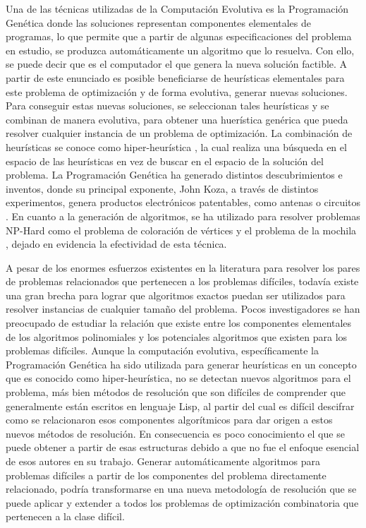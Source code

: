 Una de las técnicas utilizadas de la Computación Evolutiva es la Programación Genética donde las soluciones representan componentes elementales de programas, lo que permite que a partir de algunas especificaciones del problema en estudio, se produzca automáticamente un algoritmo que lo resuelva. Con ello, se puede decir que es el computador el que genera la nueva solución factible.
A partir de este enunciado es posible beneficiarse de heurísticas elementales para este problema de optimización y de forma evolutiva, generar nuevas soluciones. Para conseguir estas nuevas soluciones, se seleccionan tales heurísticas y se combinan de manera evolutiva, para obtener una huerística genérica que pueda resolver cualquier instancia de un problema de optimización.
La combinación de heurísticas se conoce como hiper-heurística \citep{burke2010genetic}, la cual realiza una búsqueda en el espacio de las heurísticas en vez de buscar en el espacio de la solución del problema.
La Programación Genética ha generado distintos descubrimientos e inventos, donde su principal exponente, John Koza, a través de distintos experimentos, genera productos electrónicos patentables, como antenas o circuitos \citep{Koza03}. En cuanto a la generación de algoritmos, se ha utilizado para resolver problemas NP-Hard como el problema de coloración de vértices \citep{bolton2013} y el problema de la mochila \citep{parada_2015}, dejado en evidencia la efectividad de esta técnica.


A pesar de los enormes esfuerzos existentes en la literatura para resolver los pares de problemas relacionados que pertenecen a los problemas difíciles, todavía existe una gran brecha para lograr que algoritmos exactos puedan ser utilizados para resolver instancias de cualquier tamaño del problema. Pocos investigadores se han preocupado de estudiar la relación que existe entre los componentes elementales de los algoritmos polinomiales  y los potenciales algoritmos que existen para los problemas difíciles. Aunque la computación evolutiva, específicamente la  Programación Genética ha sido utilizada para generar heurísticas en un concepto que es conocido como hiper-heurística, no se detectan nuevos algoritmos para el problema, más bien métodos de resolución que son difíciles de comprender que generalmente están escritos en lenguaje Lisp, al partir del cual es difícil descifrar como se relacionaron esos componentes algorítmicos para dar origen a estos nuevos métodos de resolución. En consecuencia es poco conocimiento el que se puede obtener a partir de esas estructuras debido a que no fue el enfoque esencial de esos autores en su trabajo. Generar automáticamente algoritmos para problemas difíciles a partir de los componentes del problema directamente relacionado, podría transformarse en una nueva metodología de resolución que se puede aplicar y extender a todos los problemas de optimización combinatoria que pertenecen a la clase difícil.

